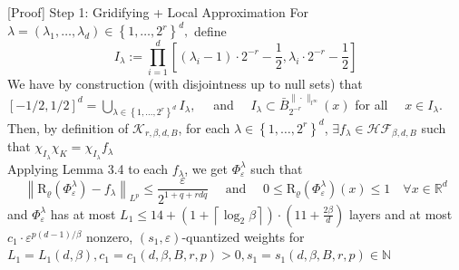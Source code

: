 \documentclass{if-beamer}
\begin{document}
\begin{frame}{[Proof] Step 1: Gridifying + Local Approximation}
    For $\lambda=\left(\lambda_{1}, \ldots, \lambda_{d}\right) \in\left\{1, \ldots, 2^{r}\right\}^{d},$ define
    \[
    I_{\lambda}:=\prod_{i=1}^{d}\left[\left(\lambda_{i}-1\right) \cdot 2^{-r}-\frac{1}{2}, \lambda_{i} \cdot 2^{-r}-\frac{1}{2}\right]
    \]
    We have by construction (with disjointness up to null sets) that
    $[-1 / 2,1 / 2]^{d}=\bigcup_{\lambda \in\left\{1, \ldots, 2^{r}\right\}^{d}} I_{\lambda}, \quad$ and $\quad I_{\lambda} \subset \bar{B}_{2^{-r}}^{\|\cdot\|_{l^{\infty}}}(x)$ for all $\quad x \in I_{\lambda}$.\\
    Then, by definition of $\mathcal{K}_{r,\beta,d,B}$, for each $\lambda \in \left\{1, \ldots, 2^{r}\right\}^{d}$, $\exists f_{\lambda} \in \mathcal{HF}_{\beta, d, B}$ such that $\chi_{I_{\lambda}} \chi_{K} = \chi_{I_{\lambda}}f_{\lambda}$\\
    Applying Lemma 3.4 to each $f_{\lambda}$, we get $\Phi_{\varepsilon}^{\lambda}$ such that
    {\small
    $$\left\|\mathrm{R}_{\varrho}\left(\Phi_{\varepsilon}^{\lambda}\right)-f_{\lambda}\right\|_{L^{p}} \leq \frac{\varepsilon}{2^{1+q+r d q}} \quad \text { and } \quad 0 \leq \mathrm{R}_{\varrho}\left(\Phi_{\varepsilon}^{\lambda}\right)(x) \leq 1 \quad \forall x \in \mathbb{R}^{d}
    $$
    }%
    and $\Phi_{\varepsilon}^{\lambda}$ has at most $L_1 \leq 14+\left(1+\left\lceil\log _{2} \beta\right\rceil\right) \cdot(11+\frac{2\beta}{d})$ layers and at most $c_1\cdot \varepsilon^{p(d-1)/\beta}$ nonzero, $(s_1, \varepsilon)$-quantized weights for $L_1 = L_1(d,\beta), c_1 = c_1(d,\beta, B, r, p)>0, s_1=s_1(d,\beta,B,r,p) \in \mathbb{N}$ 
\end{frame}
\end{document}
